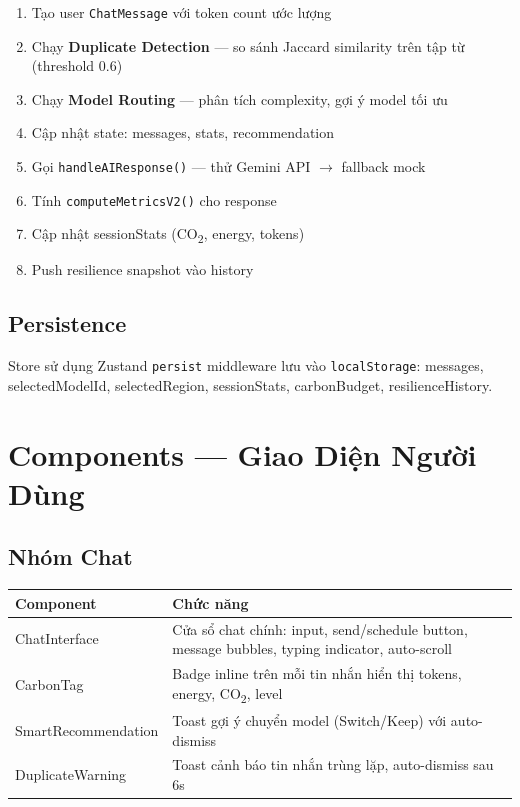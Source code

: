 \documentclass[12pt,a4paper]{article}
\begin{document}
\begin{enumerate}
    \item Tạo user \texttt{ChatMessage} với token count ước lượng
    \item Chạy \textbf{Duplicate Detection} — so sánh Jaccard similarity trên tập từ (threshold 0.6)
    \item Chạy \textbf{Model Routing} — phân tích complexity, gợi ý model tối ưu
    \item Cập nhật state: messages, stats, recommendation
    \item Gọi \texttt{handleAIResponse()} — thử Gemini API $\rightarrow$ fallback mock
    \item Tính \texttt{computeMetricsV2()} cho response
    \item Cập nhật sessionStats (CO\textsubscript{2}, energy, tokens)
    \item Push resilience snapshot vào history
\end{enumerate}

\subsection{Persistence}

Store sử dụng Zustand \texttt{persist} middleware lưu vào \texttt{localStorage}:
messages, selectedModelId, selectedRegion, sessionStats, carbonBudget, resilienceHistory.

\section{Components — Giao Diện Người Dùng}

\subsection{Nhóm Chat}

\begin{table}[h]
    \centering
    \begin{tabular}{lp{9cm}}
        \toprule
        \textbf{Component} & \textbf{Chức năng} \\
        \midrule
        ChatInterface & Cửa sổ chat chính: input, send/schedule button, message bubbles, typing indicator, auto-scroll \\
        CarbonTag & Badge inline trên mỗi tin nhắn hiển thị tokens, energy, CO\textsubscript{2}, level \\
        SmartRecommendation & Toast gợi ý chuyển model (Switch/Keep) với auto-dismiss \\
        DuplicateWarning & Toast cảnh báo tin nhắn trùng lặp, auto-dismiss sau 6s \\
        \bottomrule
    \end{tabular}
\end{table}
\end{document}
